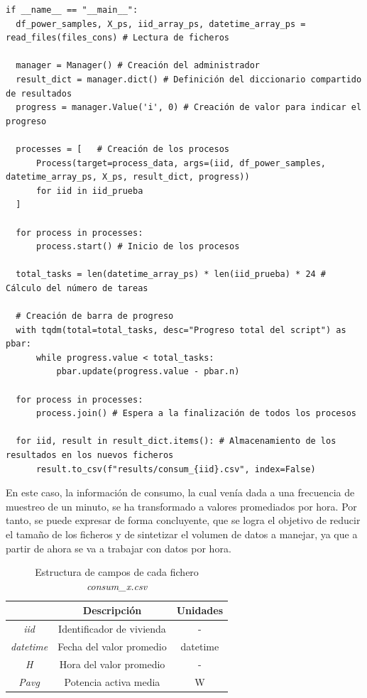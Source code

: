 \begin{lstlisting}[style=Python, caption={Creación de procesos}]
  if __name__ == "__main__":
  df_power_samples, X_ps, iid_array_ps, datetime_array_ps = read_files(files_cons) # Lectura de ficheros

  manager = Manager() # Creación del administrador
  result_dict = manager.dict() # Definición del diccionario compartido de resultados
  progress = manager.Value('i', 0) # Creación de valor para indicar el progreso

  processes = [   # Creación de los procesos
      Process(target=process_data, args=(iid, df_power_samples, datetime_array_ps, X_ps, result_dict, progress))
      for iid in iid_prueba
  ]

  for process in processes: 
      process.start() # Inicio de los procesos

  total_tasks = len(datetime_array_ps) * len(iid_prueba) * 24 # Cálculo del número de tareas

  # Creación de barra de progreso
  with tqdm(total=total_tasks, desc="Progreso total del script") as pbar:
      while progress.value < total_tasks:
          pbar.update(progress.value - pbar.n)

  for process in processes:
      process.join() # Espera a la finalización de todos los procesos

  for iid, result in result_dict.items(): # Almacenamiento de los resultados en los nuevos ficheros
      result.to_csv(f"results/consum_{iid}.csv", index=False) 
\end{lstlisting}

\vspace{5mm}

En este caso, la información de consumo, la cual venía dada a una frecuencia de muestreo de un minuto, se ha transformado a valores promediados por hora. Por tanto, se puede expresar de forma concluyente, que se logra el objetivo de reducir el tamaño de los ficheros y de sintetizar el volumen de datos a manejar, ya que a partir de ahora se va a trabajar con datos por hora.

\vspace{3mm}

\begin{table}[h!]
  \centering
  \begin{tabular}{|c|c|c|}
  \hline
  \rowcolor[HTML]{AAAAAA} 
  \multicolumn{1}{|c|}{\cellcolor[HTML]{AAAAAA}Campo} & \multicolumn{1}{c|}{\cellcolor[HTML]{AAAAAA}Descripción} & Unidades \\ \hline
  \textit{iid} & Identificador de vivienda & - \\ \hline
  \textit{datetime} & Fecha del valor promedio & datetime \\ \hline
  \textit{H} & Hora del valor promedio & - \\ \hline
  \textit{Pavg} & Potencia activa media & W \\ \hline
  \end{tabular}
  \caption{Estructura de campos de cada fichero \textit{consum\_x.csv}}
  \label{tab:consum}
\end{table}

